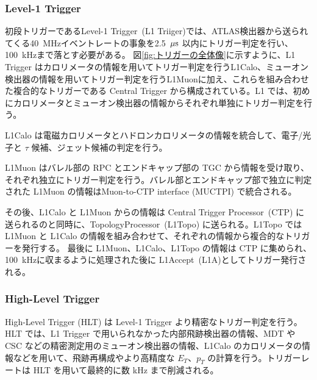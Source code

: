 \subsubsection{Level-1 Trigger}
初段トリガーであるLevel-1 Trigger~(L1 Triiger)では、ATLAS検出器から送られてくる40~MHzイベントレートの事象を2.5~$\rm{\mu s}$ 以内にトリガー判定を行い、100~kHzまで落とす必要がある。
図\ref{fig:トリガーの全体像}に示すように、L1 Trigger はカロリメータの情報を用いてトリガー判定を行うL1Calo、ミューオン検出器の情報を用いてトリガー判定を行うL1Muonに加え、これらを組み合わせた複合的なトリガーである Central Trigger から構成されている。L1 では、初めにカロリメータとミューオン検出器の情報からそれぞれ単独にトリガー判定を行う。

L1Calo は電磁カロリメータとハドロンカロリメータの情報を統合して、電子/光子と $\tau$ 候補、ジェット候補の判定を行う。

L1Muon はバレル部の RPC とエンドキャップ部の TGC から情報を受け取り、それぞれ独立にトリガー判定を行う。バレル部とエンドキャップ部で独立に判定された L1Muon の情報はMuon-to-CTP interface (MUCTPI) で統合される。

その後、L1Calo と L1Muon からの情報は Central Trigger Processor~(CTP) に送られるのと同時に、TopologyProcessor~(L1Topo) に送られる。L1Topo では L1Muon と L1Calo の情報を組み合わせて、それぞれの情報から複合的なトリガーを発行する。
最後に L1Muon、L1Calo、L1Topo の情報は CTP に集められ、100~kHzに収まるように処理された後に L1Accept~(L1A)としてトリガー発行される。

\subsubsection{High-Level Trigger}
High-Level Trigger (HLT) は Level-1 Trigger より精密なトリガー判定を行う。
HLT では、L1 Trigger で用いられなかった内部飛跡検出器の情報、MDT や CSC などの精密測定用のミューオン検出器の情報、L1Calo のカロリメータの情報などを用いて、飛跡再構成やより高精度な $E_T$、$p_T$ の計算を行う。トリガーレートは HLT を用いて最終的に数 kHz まで削減される。

